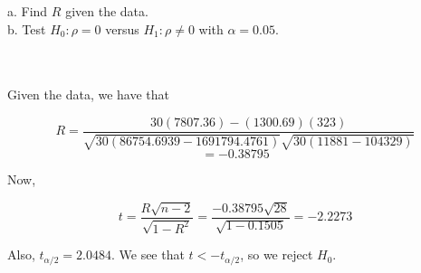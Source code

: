 a. Find $R$ given the data.\\

b. Test $H_0:\rho=0$ versus $H_1:\rho\neq0$ with $\alpha=0.05$.\\\\

\begin{solution}\renewcommand{\qedsymbol}{}\ \\
    Given the data, we have that
    
    $$R=\frac{30(7807.36)-(1300.69)(323)}{\sqrt{30(86754.6939-1691794.4761)}\sqrt{30(11881-104329)}}$$
    $$=-0.38795$$

    Now,
    
    $$t=\frac{R\sqrt{n-2}}{\sqrt{1-R^2}}=\frac{-0.38795\sqrt{28}}{\sqrt{1-0.1505}}=-2.2273$$
    
    Also, $t_{\alpha/2}=2.0484$. We see that $t<-t_{\alpha/2}$, so we reject $H_0$.

\end{solution}
